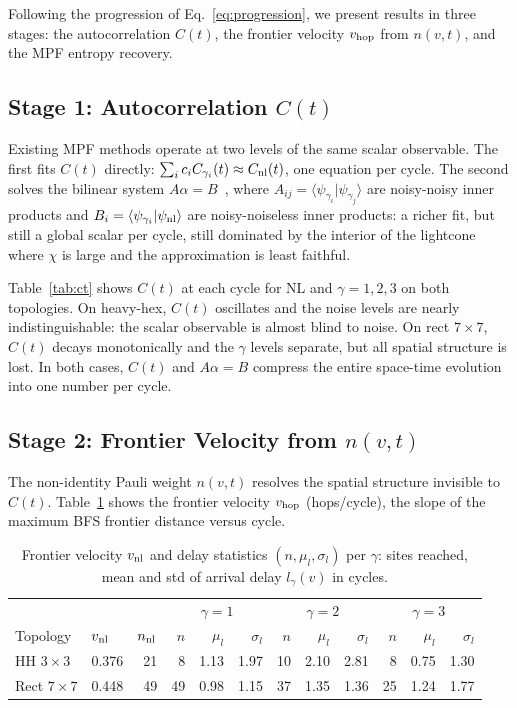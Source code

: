 \documentclass[letterpaper]{article}
\begin{document}
Following the progression of Eq.~\ref{eq:progression}, we present
results in three stages: the autocorrelation $C(t)$, the frontier
velocity $v_{\rm hop}$ from $n(v,t)$, and the MPF entropy recovery.

\subsection{Stage 1: Autocorrelation $C(t)$}

Existing MPF methods operate at two levels of the same scalar observable.
The first fits $C(t)$ directly: $\sum_i c_i C_{\gamma_i}(t) \approx C_{\rm nl}(t)$,
one equation per cycle.
The second solves the bilinear system $A\alpha = B$~\cite{mpf-ref,robertson2026lindbladmultiproductformulas}, where
$A_{ij} = \langle\psi_{\gamma_i}|\psi_{\gamma_j}\rangle$ are noisy-noisy
inner products and $B_i = \langle\psi_{\gamma_i}|\psi_{\rm nl}\rangle$
are noisy-noiseless inner products: a richer fit, but still a global
scalar per cycle, still dominated by the interior of the lightcone
where $\chi$ is large and the approximation is least faithful.

Table~\ref{tab:ct} shows $C(t)$ at each cycle for NL and
$\gamma=1,2,3$ on both topologies.
On heavy-hex, $C(t)$ oscillates and the noise levels are nearly
indistinguishable: the scalar observable is almost blind to noise.
On rect $7\times7$, $C(t)$ decays monotonically and the $\gamma$
levels separate, but all spatial structure is lost.
In both cases, $C(t)$ and $A\alpha=B$ compress the entire
space-time evolution into one number per cycle.

\subsection{Stage 2: Frontier Velocity from $n(v,t)$}

The non-identity Pauli weight $n(v,t)$ resolves the spatial structure
invisible to $C(t)$.
Table~\ref{tab:vhop} shows the frontier velocity $v_{\rm hop}$
(hops/cycle), the slope of the maximum BFS frontier distance versus cycle.

\begin{table}[t]
\centering
\setlength{\tabcolsep}{2pt}
\scriptsize
\begin{tabular}{llr rrr rrr rrr}
\toprule
 & & & \multicolumn{3}{c}{$\gamma=1$} & \multicolumn{3}{c}{$\gamma=2$} & \multicolumn{3}{c}{$\gamma=3$} \\
Topology & $v_{\rm nl}$ & $n_{\rm nl}$ & $n$ & $\mu_l$ & $\sigma_l$ & $n$ & $\mu_l$ & $\sigma_l$ & $n$ & $\mu_l$ & $\sigma_l$ \\
\midrule
HH $3\times3$ & 0.376 & 21 & 8 & 1.13 & 1.97 & 10 & 2.10 & 2.81 & 8 & 0.75 & 1.30 \\
Rect $7\times7$ & 0.448 & 49 & 49 & 0.98 & 1.15 & 37 & 1.35 & 1.36 & 25 & 1.24 & 1.77 \\
\bottomrule
\end{tabular}
\caption{Frontier velocity $v_{\rm nl}$ and delay statistics
$(n,\mu_l,\sigma_l)$ per $\gamma$: sites reached, mean and std of
arrival delay $l_\gamma(v)$ in cycles.}
\label{tab:vhop}
\end{table}
\end{document}
